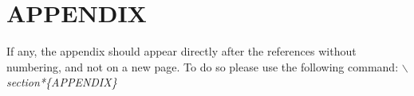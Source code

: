 \documentclass[a4paper,twoside]{article}
\begin{document}
\vfill

{\small
}


\section*{\uppercase{Appendix}}

If any, the appendix should appear directly after the
references without numbering, and not on a new page. To do so please use the following command:
\textit{$\backslash$section*\{APPENDIX\}}

\vfill
\end{document}
